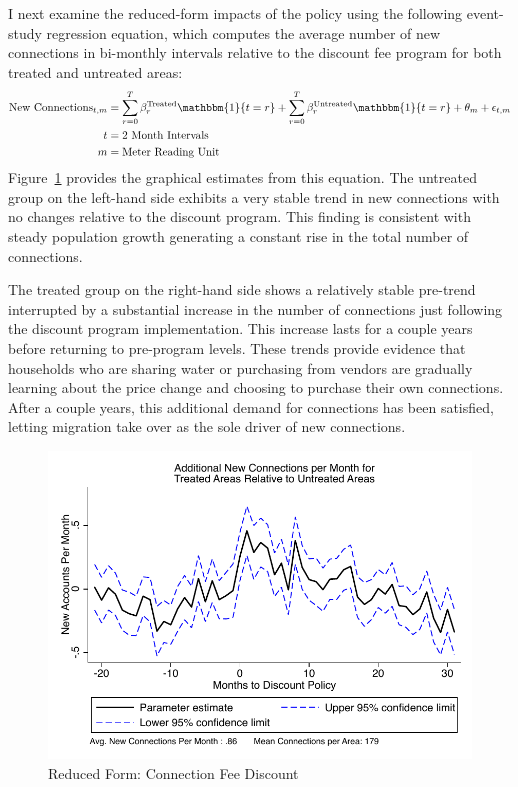 \documentclass[12pt]{article}
\begin{document}
I next examine the reduced-form impacts of the policy using the following event-study regression equation, which computes the average number of new connections in bi-monthly intervals relative to the discount fee program for both treated and untreated areas:
\begin{align*}
\text{New Connections}_{t,m} &= \sum_{r=0}^{T} \beta^{\text{Treated}}_{r} \mathbbm{1} \{t=r\} + \sum_{r=0}^{T} \beta^{\text{Untreated}}_{r} \mathbbm{1} \{t=r\}  +  \theta_{m} + \epsilon_{t,m} \\
t &= \text{2 Month Intervals}\\
m &= \text{Meter Reading Unit}
\end{align*}
Figure~\ref{figure:discountreducedform} provides the graphical estimates from this equation.  The untreated group on the left-hand side exhibits a very stable trend in new connections with no changes relative to the discount program.  This finding is consistent with steady population growth generating a constant rise in the total number of connections.

The treated group on the right-hand side shows a relatively stable pre-trend interrupted by a substantial increase in the number of connections just following the discount program implementation.  This increase lasts for a couple years before returning to pre-program levels.  These trends provide evidence that households who are sharing water or purchasing from vendors are gradually learning about the price change and choosing to purchase their own connections.  After a couple years, this additional demand for connections has been satisfied, letting migration take over as the sole driver of new connections.
\begin{figure}
\centering
\caption{Reduced Form: Connection Fee Discount}\label{figure:discountreducedform}
\includegraphics[scale=.8]{tables/diff_595.pdf}
\end{figure}
\end{document}
